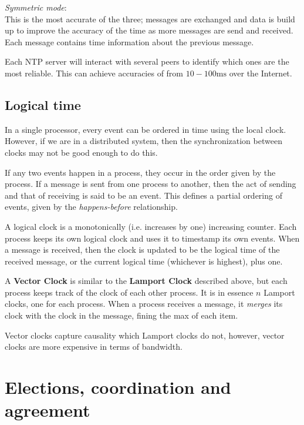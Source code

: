 \begin{description}
\begin{description}
      \item \textit{Symmetric mode}:\\
        This is the most accurate of the three; messages are exchanged and data
        is build up to improve the accuracy of the time as more messages are 
        send and received. Each message contains time information about the
        previous message.

        Each NTP server will interact with several peers to identify which ones
        are the most reliable. This can achieve accuracies of from
        $10-100\si{\milli\second}$ over the Internet.
    \end{description}
\end{description}

\subsection{Logical time}

In a single processor, every event can be ordered in time using the local clock.
However, if we are in a distributed system, then the synchronization between
clocks may not be good enough to do this.

If any two events happen in a process, they occur in the order given by the
process. If a message is sent from one process to another, then the act of
sending and that of receiving is said to be an event. This defines a partial
ordering of events, given by the \textit{happens-before} relationship.

A logical clock is a monotonically (i.e. increases by one) increasing counter.
Each process keeps its own logical clock and uses it to timestamp its own
events. When a message is received, then the clock is updated to be the logical
time of the received message, or the current logical time (whichever is
highest), plus one.

A \textbf{Vector Clock} is similar to the \textbf{Lamport Clock} described
above, but each process keeps track of the clock of each other process. It is in
essence $n$ Lamport clocks, one for each process. When a process receives a
message, it \textit{merges} its clock with the clock in the message, fining the
max of each item.

Vector clocks capture causality which Lamport clocks do not, however, vector
clocks are more expensive in terms of bandwidth.

\section{Elections, coordination and agreement}

